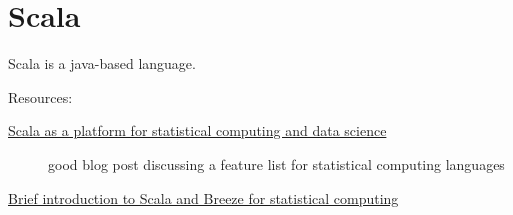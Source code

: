 \chapter{Scala}

Scala is a java-based language.

Resources:

\begin{description}
\item [\href{http://darrenjw.wordpress.com/2013/12/23/scala-as-a-platform-for-statistical-computing-and-data-science/}{Scala as a platform for statistical computing and data science}] good blog post discussing a feature list for statistical computing languages
\item [\href{http://darrenjw.wordpress.com/2013/12/30/brief-introduction-to-scala-and-breeze-for-statistical-computing/}{Brief introduction to Scala and Breeze for statistical computing}]
\end{description}
